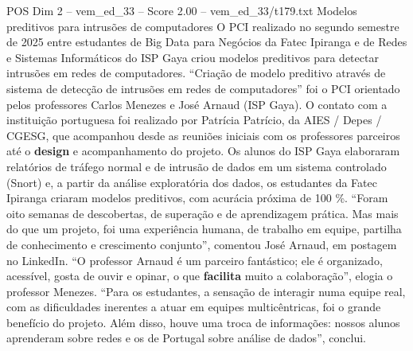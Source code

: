 \begin{textsample}{POS Dim 2 – vem\_ed\_33 – Score 2.00 – vem\_ed\_33/t179.txt}  \label{ex:f2_pos_146}
Modelos preditivos para intrusões de computadores O PCI realizado no segundo semestre de 2025 entre estudantes de Big Data para Negócios da Fatec Ipiranga e de Redes e Sistemas Informáticos do ISP Gaya criou modelos preditivos para detectar intrusões em redes de computadores. “Criação de modelo preditivo através de sistema de detecção de intrusões em redes de computadores” foi o PCI orientado pelos professores Carlos Menezes e José Arnaud (ISP Gaya).
O contato com a instituição portuguesa foi realizado por Patrícia Patrício, da AIES / Depes / CGESG, que acompanhou desde as reuniões iniciais com os professores parceiros até o \textbf{design} e acompanhamento do projeto.
Os alunos do ISP Gaya elaboraram relatórios de tráfego normal e de intrusão de dados em um sistema controlado (Snort) e, a partir da análise exploratória dos dados, os estudantes da Fatec Ipiranga criaram modelos preditivos, com acurácia próxima de 100 \%. “Foram oito semanas de descobertas, de superação e de aprendizagem prática.
Mas mais do que um projeto, foi uma experiência humana, de trabalho em equipe, partilha de conhecimento e crescimento conjunto”, comentou José Arnaud, em postagem no LinkedIn. “O professor Arnaud é um parceiro fantástico; ele é organizado, acessível, gosta de ouvir e opinar, o que \textbf{facilita} muito a colaboração”, elogia o professor Menezes. “Para os estudantes, a sensação de interagir numa equipe real, com as dificuldades inerentes a atuar em equipes multicêntricas, foi o grande benefício do projeto.
Além disso, houve uma troca de informações: nossos alunos aprenderam sobre redes e os de Portugal sobre análise de dados”, conclui.

\end{textsample}
